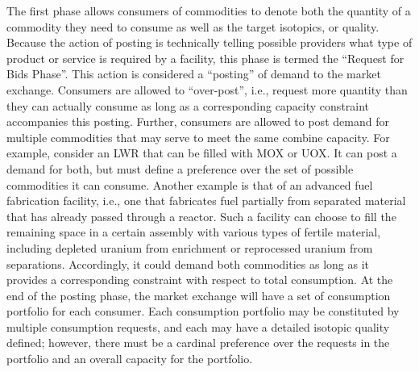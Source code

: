 The first phase allows consumers of commodities to denote both the quantity of a
commodity they need to consume as well as the target isotopics, or
quality. Because the action of posting is technically telling possible providers
what type of product or service is required by a facility, this phase is termed
the ``Request for Bids Phase''. This action is considered a ``posting'' of
demand to the market exchange. Consumers are allowed to ``over-post'', i.e.,
request more quantity than they can actually consume as long as a corresponding
capacity constraint accompanies this posting. Further, consumers are allowed to
post demand for multiple commodities that may serve to meet the same combine
capacity. For example, consider an LWR that can be filled with MOX or UOX. It
can post a demand for both, but must define a preference over the set of
possible commodities it can consume. Another example is that of an advanced fuel
fabrication facility, i.e., one that fabricates fuel partially from separated
material that has already passed through a reactor. Such a facility can choose
to fill the remaining space in a certain assembly with various types of fertile
material, including depleted uranium from enrichment or reprocessed uranium from
separations. Accordingly, it could demand both commodities as long as it
provides a corresponding constraint with respect to total consumption. At the
end of the posting phase, the market exchange will have a set of consumption
portfolio for each consumer. Each consumption portfolio may be constituted by
multiple consumption requests, and each may have a detailed isotopic quality
defined; however, there must be a cardinal preference over the requests in the
portfolio and an overall capacity for the portfolio.

